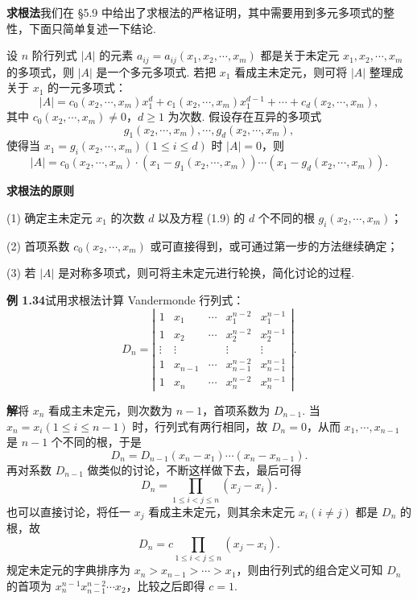\documentclass[UTF8, 12pt, fontset=fandol, oneside]{ctexart}
\begin{document}
\noindent\textbf{求根法}\quad 我们在 §5.9 中给出了求根法的严格证明，其中需要用到多元多项式的整性，下面只简单复述一下结论.

设 $n$ 阶行列式 $|A|$ 的元素 $a_{ij}=a_{ij}(x_1,x_2,\cdots,x_m)$ 都是关于未定元 $x_1,x_2,\cdots,x_m$ 的多项式，则 $|A|$ 是一个多元多项式. 若把 $x_1$ 看成主未定元，则可将 $|A|$ 整理成关于 $x_1$ 的一元多项式：
\begin{equation}
|A|=c_0(x_2,\cdots,x_m)x_1^d+c_1(x_2,\cdots,x_m)x_1^{d-1}
+\cdots+c_d(x_2,\cdots,x_m),
\tag{1.9}
\end{equation}
其中 $c_0(x_2,\cdots,x_m)\ne0$，$d\ge1$ 为次数. 假设存在互异的多项式
\[
g_1(x_2,\cdots,x_m),\cdots,g_d(x_2,\cdots,x_m),
\]
使得当 $x_1=g_i(x_2,\cdots,x_m)(1\le i\le d)$ 时 $|A|=0$，则
\[
|A|=c_0(x_2,\cdots,x_m)\cdot(x_1-g_1(x_2,\cdots,x_m))\cdots
(x_1-g_d(x_2,\cdots,x_m)).
\]

\noindent\textbf{求根法的原则}

(1) 确定主未定元 $x_1$ 的次数 $d$ 以及方程 (1.9) 的 $d$ 个不同的根 $g_i(x_2,\cdots,x_m)$；

(2) 首项系数 $c_0(x_2,\cdots,x_m)$ 或可直接得到，或可通过第一步的方法继续确定；

(3) 若 $|A|$ 是对称多项式，则可将主未定元进行轮换，简化讨论的过程.

\noindent\textbf{例 1.34}\quad 试用求根法计算 Vandermonde 行列式：
\[
D_n=\left|\begin{array}{ccccc}
1 & x_1 & \cdots & x_1^{n-2} & x_1^{n-1}\\
1 & x_2 & \cdots & x_2^{n-2} & x_2^{n-1}\\
\vdots & \vdots &        & \vdots & \vdots\\
1 & x_{n-1} & \cdots & x_{n-1}^{n-2} & x_{n-1}^{n-1}\\
1 & x_n & \cdots & x_n^{n-2} & x_n^{n-1}
\end{array}\right|.
\]

\noindent\textbf{解}\quad 将 $x_n$ 看成主未定元，则次数为 $n-1$，首项系数为 $D_{n-1}$. 当 $x_n=x_i(1\le i\le n-1)$ 时，行列式有两行相同，故 $D_n=0$，从而 $x_1,\cdots,x_{n-1}$ 是 $n-1$ 个不同的根，于是
\[
D_n=D_{n-1}(x_n-x_1)\cdots(x_n-x_{n-1}).
\]
再对系数 $D_{n-1}$ 做类似的讨论，不断这样做下去，最后可得
\[
D_n=\prod_{1\le i<j\le n}(x_j-x_i).
\]
也可以直接讨论，将任一 $x_j$ 看成主未定元，则其余未定元 $x_i(i\ne j)$ 都是 $D_n$ 的根，故
\[
D_n=c\prod_{1\le i<j\le n}(x_j-x_i).
\]
规定未定元的字典排序为 $x_n>x_{n-1}>\cdots>x_1$，则由行列式的组合定义可知 $D_n$ 的首项为 $x_n^{n-1}x_{n-1}^{n-2}\cdots x_2$，比较之后即得 $c=1$.
\end{document}
